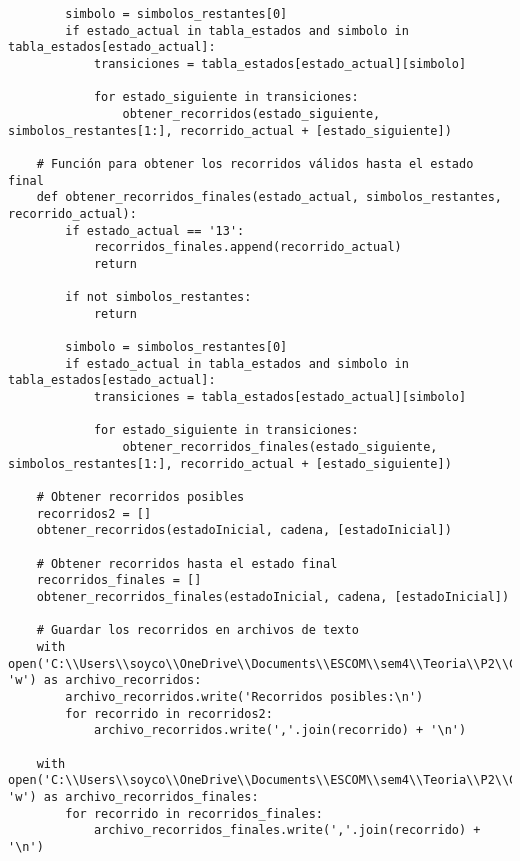 \begin{lstlisting}
        simbolo = simbolos_restantes[0]
        if estado_actual in tabla_estados and simbolo in tabla_estados[estado_actual]:
            transiciones = tabla_estados[estado_actual][simbolo]

            for estado_siguiente in transiciones:
                obtener_recorridos(estado_siguiente, simbolos_restantes[1:], recorrido_actual + [estado_siguiente])

    # Función para obtener los recorridos válidos hasta el estado final
    def obtener_recorridos_finales(estado_actual, simbolos_restantes, recorrido_actual):
        if estado_actual == '13':
            recorridos_finales.append(recorrido_actual)
            return

        if not simbolos_restantes:
            return

        simbolo = simbolos_restantes[0]
        if estado_actual in tabla_estados and simbolo in tabla_estados[estado_actual]:
            transiciones = tabla_estados[estado_actual][simbolo]

            for estado_siguiente in transiciones:
                obtener_recorridos_finales(estado_siguiente, simbolos_restantes[1:], recorrido_actual + [estado_siguiente])

    # Obtener recorridos posibles
    recorridos2 = []
    obtener_recorridos(estadoInicial, cadena, [estadoInicial])

    # Obtener recorridos hasta el estado final
    recorridos_finales = []
    obtener_recorridos_finales(estadoInicial, cadena, [estadoInicial])

    # Guardar los recorridos en archivos de texto
    with open('C:\\Users\\soyco\\OneDrive\\Documents\\ESCOM\\sem4\\Teoria\\P2\\Chess\\output\\recorridos_negra.txt', 'w') as archivo_recorridos:
        archivo_recorridos.write('Recorridos posibles:\n')
        for recorrido in recorridos2:
            archivo_recorridos.write(','.join(recorrido) + '\n')

    with open('C:\\Users\\soyco\\OneDrive\\Documents\\ESCOM\\sem4\\Teoria\\P2\\Chess\\output\\recorridos_finales_negra.txt', 'w') as archivo_recorridos_finales:
        for recorrido in recorridos_finales:
            archivo_recorridos_finales.write(','.join(recorrido) + '\n')



\end{lstlisting}
